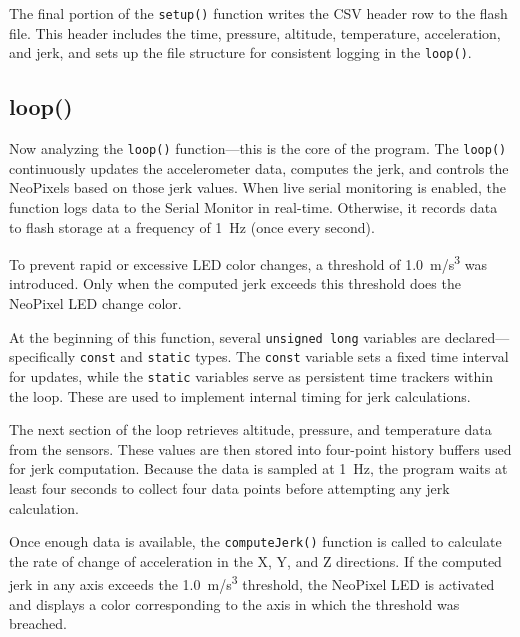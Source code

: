 \documentclass[12pt]{report}
\begin{document}
The final portion of the \texttt{setup()} function writes the CSV header row to the flash file. This header includes the time, pressure, altitude, temperature, acceleration, and jerk, and sets up the file structure for consistent logging in the \texttt{loop()}.







\subsection*{loop()}

Now analyzing the \texttt{loop()} function---this is the core of the program. The \texttt{loop()} continuously updates the accelerometer data, computes the jerk, and controls the NeoPixels based on those jerk values. When live serial monitoring is enabled, the function logs data to the Serial Monitor in real-time. Otherwise, it records data to flash storage at a frequency of 1~Hz (once every second). \newline

To prevent rapid or excessive LED color changes, a threshold of 1.0~m/s\textsuperscript{3} was introduced. Only when the computed jerk exceeds this threshold does the NeoPixel LED change color. \newline

At the beginning of this function, several \texttt{unsigned long} variables are declared---specifically \texttt{const} and \texttt{static} types. The \texttt{const} variable sets a fixed time interval for updates, while the \texttt{static} variables serve as persistent time trackers within the loop. These are used to implement internal timing for jerk calculations. \newline

The next section of the loop retrieves altitude, pressure, and temperature data from the sensors. These values are then stored into four-point history buffers used for jerk computation. Because the data is sampled at 1~Hz, the program waits at least four seconds to collect four data points before attempting any jerk calculation. \newline

Once enough data is available, the \texttt{computeJerk()} function is called to calculate the rate of change of acceleration in the X, Y, and Z directions. If the computed jerk in any axis exceeds the 1.0~m/s\textsuperscript{3} threshold, the NeoPixel LED is activated and displays a color corresponding to the axis in which the threshold was breached. \newline
\end{document}
